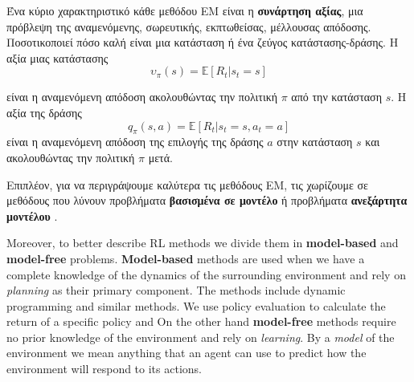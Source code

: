 Ένα κύριο χαρακτηριστικό κάθε μεθόδου ΕΜ είναι η \textbf{συνάρτηση αξίας}, μια πρόβλεψη της αναμενόμενης, σωρευτικής, εκπτωθείσας, μέλλουσας
απόδοσης. Ποσοτικοποιεί πόσο καλή είναι μια κατάσταση ή ένα ζεύγος κατάστασης-δράσης. Η αξία μιας κατάστασης
\begin{equation}
    \upsilon_\pi(s) =\mathbb{E}[R_t | s_t = s]
\end{equation}

είναι η αναμενόμενη απόδοση ακολουθώντας την πολιτική $π$ από την κατάσταση $s$. Η αξία της δράσης
\begin{equation}
    q_\pi(s,a) =\mathbb{E}[R_t | s_t = s, a_t = a]
\end{equation}
είναι η αναμενόμενη απόδοση της επιλογής της δράσης $a$ στην κατάσταση $s$ και ακολουθώντας την πολιτική $π$ μετά.

Επιπλέον, για να περιγράψουμε καλύτερα τις μεθόδους ΕΜ, τις χωρίζουμε σε μεθόδους που λύνουν προβλήματα
\textbf{βασισμένα σε μοντέλο } ή προβλήματα \textbf{ανεξάρτητα μοντέλου }.

Moreover, to better describe RL methods we divide them in
\textbf{model-based} and \textbf{model-free} problems. \textbf{Model-based} methods are used when we have a
complete knowledge of the dynamics of the surrounding environment and rely on \textit{planning} as their primary component.
The methods include dynamic programming and similar methods. We use policy evaluation to calculate the return of a specific policy and
On the other hand \textbf{model-free} methods require no prior knowledge of the environment and rely on \textit{learning}.
By a \textit{model} of the environment we mean anything that an agent can use to predict how the environment will respond to
its actions.

